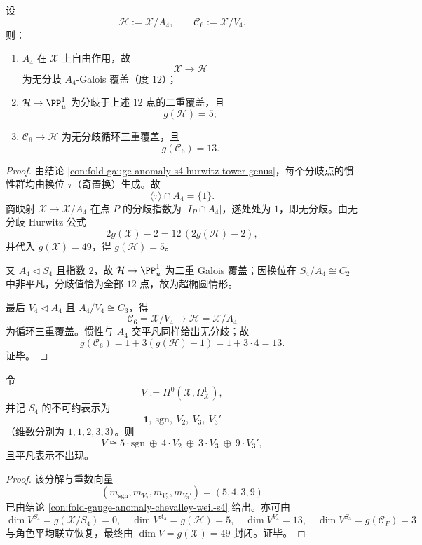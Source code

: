 \begin{theorem}[偶子群自由作用与无分歧 \(A_4\)-提升]\label{thm:killo-s4-even-subgroup-free-action-unramified-a4-lift}
设
\[
\mathcal H:=\mathcal X/A_4,\qquad
\mathcal C_6:=\mathcal X/V_4.
\]
则：
\begin{enumerate}
  \item \(A_4\) 在 \(\mathcal X\) 上自由作用，故
  \[
  \mathcal X\to\mathcal H
  \]
  为无分歧 \(A_4\)-Galois 覆盖（度 \(12\)）；
  \item \(\mathcal H\to \PP^1_u\) 为分歧于上述 \(12\) 点的二重覆盖，且
  \[
  g(\mathcal H)=5;
  \]
  \item \(\mathcal C_6\to\mathcal H\) 为无分歧循环三重覆盖，且
  \[
  g(\mathcal C_6)=13.
  \]
\end{enumerate}
\end{theorem}
\begin{proof}
由结论 \ref{con:fold-gauge-anomaly-s4-hurwitz-tower-genus}，每个分歧点的惯性群均由换位 \(\tau\)（奇置换）生成。故
\[
\langle\tau\rangle\cap A_4=\{1\}.
\]
商映射 \(\mathcal X\to \mathcal X/A_4\) 在点 \(P\) 的分歧指数为 \(|I_P\cap A_4|\)，遂处处为 \(1\)，即无分歧。由无分歧 Hurwitz 公式
\[
2g(\mathcal X)-2=12\,(2g(\mathcal H)-2),
\]
并代入 \(g(\mathcal X)=49\)，得 \(g(\mathcal H)=5\)。

又 \(A_4\triangleleft S_4\) 且指数 \(2\)，故 \(\mathcal H\to\PP^1_u\) 为二重 Galois 覆盖；因换位在 \(S_4/A_4\cong C_2\) 中非平凡，分歧值恰为全部 \(12\) 点，故为超椭圆情形。

最后 \(V_4\triangleleft A_4\) 且 \(A_4/V_4\cong C_3\)，得
\[
\mathcal C_6=\mathcal X/V_4\to \mathcal H=\mathcal X/A_4
\]
为循环三重覆盖。惯性与 \(A_4\) 交平凡同样给出无分歧；故
\[
g(\mathcal C_6)=1+3(g(\mathcal H)-1)=1+3\cdot 4=13.
\]
证毕。
\end{proof}

\begin{theorem}\label{thm:killo-s4-chevalley-weil-multiplicity-49}
令
\[
V:=H^0(\mathcal X,\Omega^1_{\mathcal X}),
\]
并记 \(S_4\) 的不可约表示为
\[
\mathbf 1,\ \mathrm{sgn},\ V_2,\ V_3,\ V_3'
\]
（维数分别为 \(1,1,2,3,3\)）。则
\[
V\cong 5\cdot \mathrm{sgn}\ \oplus\ 4\cdot V_2\ \oplus\ 3\cdot V_3\ \oplus\ 9\cdot V_3',
\]
且平凡表示不出现。
\end{theorem}
\begin{proof}
该分解与重数向量
\[
(m_{\mathrm{sgn}},m_{V_2},m_{V_3},m_{V_3'})=(5,4,3,9)
\]
已由结论 \ref{con:fold-gauge-anomaly-chevalley-weil-s4} 给出。亦可由
\[
\dim V^{S_4}=g(\mathcal X/S_4)=0,\quad
\dim V^{A_4}=g(\mathcal H)=5,\quad
\dim V^{V_4}=13,\quad
\dim V^{S_3}=g(\mathcal C_F)=3
\]
与角色平均联立恢复，最终由 \(\dim V=g(\mathcal X)=49\) 封闭。证毕。
\end{proof}


